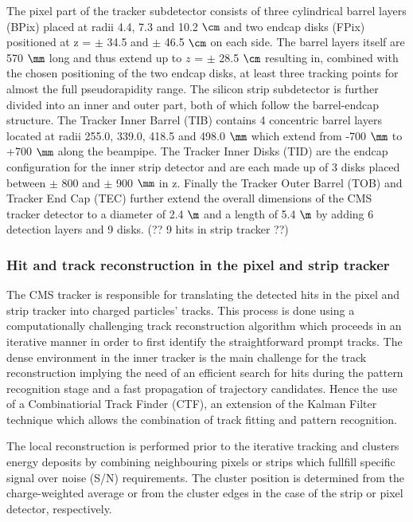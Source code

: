 The pixel part of the tracker subdetector consists of three cylindrical barrel layers (BPix) placed at radii 4.4, 7.3 and 10.2 $\cm$ and two endcap disks (FPix) positioned at z = $\pm$ 34.5 and $\pm$ 46.5 $\cm$ on each side. The barrel layers itself are 570 $\mm$ long and thus extend up to $z$ = $\pm$ 28.5 $\cm$ resulting in, combined with the chosen positioning of the two endcap disks, at least three tracking points for almost the full pseudorapidity range. The silicon strip subdetector is further divided into an inner and outer part, both of which follow the barrel-endcap structure. The Tracker Inner Barrel (TIB) contains 4 concentric barrel layers located at radii 255.0, 339.0, 418.5 and 498.0 $\mm$ which extend from -700 $\mm$ to +700 $\mm$ along the beampipe. The Tracker Inner Disks (TID) are the endcap configuration for the inner strip detector and are each made up of 3 disks placed between $\pm$ 800 and $\pm$ 900 $\mm$ in z. Finally the Tracker Outer Barrel (TOB) and Tracker End Cap (TEC) further extend the overall dimensions of the CMS tracker detector to a diameter of 2.4 $\m$ and a length of 5.4 $\m$ by adding 6 detection layers and 9 disks. (?? 9 hits in strip tracker ??)

\subsubsection*{Hit and track reconstruction in the pixel and strip tracker}

The CMS tracker is responsible for translating the detected hits in the pixel and strip tracker into charged particles' tracks. This process is done using a computationally challenging track reconstruction algorithm which proceeds in an iterative manner in order to first identify the straightforward prompt tracks.
The dense environment in the inner tracker is the main challenge for the track reconstruction implying the need of an efficient search for hits during the pattern recognition stage and a fast propagation of trajectory candidates. Hence the use of a Combinatiorial Track Finder (CTF), an extension of the Kalman Filter technique which allows the combination of track fitting and pattern recognition.

The local reconstruction is performed prior to the iterative tracking and clusters energy deposits by combining neighbouring pixels or strips which fullfill specific signal over noise (S/N) requirements. The cluster position is determined from the charge-weighted average or from the cluster edges in the case of the strip or pixel detector, respectively.

